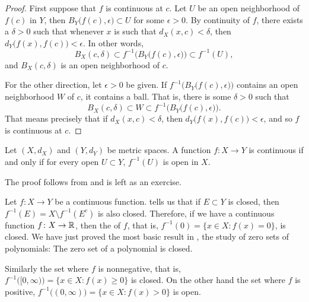 \begin{proof}
First suppose that $f$ is continuous at $c$.
Let $U$ be an open neighborhood of $f(c)$
in $Y$, then $B_Y\bigl(f(c),\epsilon\bigr) \subset U$ for some $\epsilon >
0$.  By continuity of $f$, there exists a $\delta > 0$
such that whenever $x$ is such that $d_X(x,c) < \delta$, then
$d_Y\bigl(f(x),f(c)\bigr) < \epsilon$.  In other words,
\begin{equation*}
B_X(c,\delta) \subset f^{-1}\bigl(B_Y\bigl(f(c),\epsilon\bigr)\bigr) \subset
f^{-1}(U) ,
\end{equation*}
and $B_X(c,\delta)$ is an open neighborhood of $c$.

For the other direction,
let $\epsilon > 0$ be given.  If
$f^{-1}\bigl(B_Y\bigl(f(c),\epsilon\bigr)\bigr)$ contains an open
neighborhood $W$ of $c$, it contains a ball.  That is, there is some $\delta > 0$
such that
\begin{equation*}
B_X(c,\delta) \subset W \subset f^{-1}\bigl(B_Y\bigl(f(c),\epsilon\bigr)\bigr) .
\end{equation*}
That means precisely that if $d_X(x,c) < \delta$, then $d_Y\bigl(f(x),f(c)\bigr)
< \epsilon$, and so $f$ is continuous at $c$.
\end{proof}

\begin{thm} \label{thm:mstopocont}
Let $(X,d_X)$ and $(Y,d_Y)$ be metric spaces.  A function $f \colon X \to Y$
is continuous if and only if
for every open $U \subset Y$, $f^{-1}(U)$ is open in $X$.
\end{thm}

The proof follows from  and is left as
an exercise.

\begin{example}
Let $f \colon X \to Y$ be a continuous function.
 tells us that if $E \subset Y$ is closed, then 
$f^{-1}(E) = X \setminus f^{-1}(E^c)$ is also closed.  Therefore, if
we have a continuous
function $f \colon X \to {\mathbb{R}}$, then the
\emph{} of $f$, that is, 
$f^{-1}(0) = \{ x \in X :
f(x) = 0 \}$, is closed.  We have just proved the most basic result in
\emph{}, the study of
zero sets of polynomials:  The zero set of a polynomial is closed.

Similarly the set where $f$ is nonnegative, that is,
$f^{-1}\bigl( [0,\infty) \bigr) = \{ x \in X :
f(x) \geq 0 \}$ is closed.  On the other hand the
set where $f$ is positive,
$f^{-1}\bigl( (0,\infty) \bigr) = \{ x \in X :
f(x) > 0 \}$ is open.  
\end{example}


